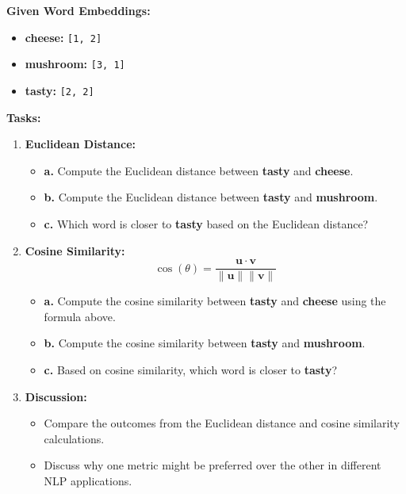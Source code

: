\documentclass[
  letterpaper,
  DIV=11,
  numbers=noendperiod]{scrreprt}
\providecommand{\tightlist}{%
  \setlength{\itemsep}{0pt}\setlength{\parskip}{0pt}}\usepackage{longtable,booktabs,array}
\begin{document}
\textbf{Given Word Embeddings:}

\begin{itemize}
\tightlist
\item
  \textbf{cheese:} \texttt{{[}1,\ 2{]}}
\item
  \textbf{mushroom:} \texttt{{[}3,\ 1{]}}
\item
  \textbf{tasty:} \texttt{{[}2,\ 2{]}}
\end{itemize}

\textbf{Tasks:}

\begin{enumerate}
\def\labelenumi{\arabic{enumi}.}
\tightlist
\item
  \textbf{Euclidean Distance:}

  \begin{itemize}
  \tightlist
  \item
    \textbf{a.} Compute the Euclidean distance between \textbf{tasty}
    and \textbf{cheese}.\\
  \item
    \textbf{b.} Compute the Euclidean distance between \textbf{tasty}
    and \textbf{mushroom}.\\
  \item
    \textbf{c.} Which word is closer to \textbf{tasty} based on the
    Euclidean distance?
  \end{itemize}
\item
  \textbf{Cosine Similarity:}\\
  \[
   \cos(\theta)=\frac{\mathbf{u}\cdot\mathbf{v}}{\|\mathbf{u}\|\|\mathbf{v}\|}
  \]

  \begin{itemize}
  \tightlist
  \item
    \textbf{a.} Compute the cosine similarity between \textbf{tasty} and
    \textbf{cheese} using the formula above.
  \item
    \textbf{b.} Compute the cosine similarity between \textbf{tasty} and
    \textbf{mushroom}.\\
  \item
    \textbf{c.} Based on cosine similarity, which word is closer to
    \textbf{tasty}?
  \end{itemize}
\item
  \textbf{Discussion:}

  \begin{itemize}
  \tightlist
  \item
    Compare the outcomes from the Euclidean distance and cosine
    similarity calculations.\\
  \item
    Discuss why one metric might be preferred over the other in
    different NLP applications.
  \end{itemize}
\end{enumerate}
\end{document}

